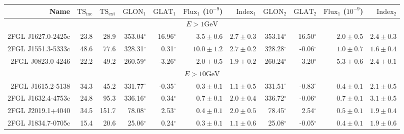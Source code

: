 \documentclass[12pt,preprint]{aastex}
\newcommand{\gev}{\text{GeV}\xspace}
\newcommand{\tsext}{{\ensuremath{\text{TS}_\text{ext}}}\xspace}
\newcommand{\tsinc}{\ensuremath{\text{TS}_\text{inc}}\xspace}
\newcommand{\glon}{\text{GLON}\xspace}
\newcommand{\glat}{\text{GLAT}\xspace}
\renewcommand{\deg}{\ensuremath{^\circ}\xspace}
\begin{document}
\clearpage
\begin{table}
    \begin{centering}
      \begin{tabular}{r|rr|rrrr|rrrr}
        \hline
        \hline
        Name                 &     \tsinc &     \tsext &      $\glon_1$ &      $\glat_1$ & $\text{Flux}_1$ ($10^{-9}$) &   $\text{Index}_1$ &      $\glon_2$ &      $\glat_2$ & $\text{Flux}_1$ ($10^{-9}$) &  $\text{Index}_2$ \\
        \hline
        \multicolumn{11}{c}{$E > 1\gev$} \\
        \hline
        2FGL J1627.0-2425c   &       23.8 &       28.9 &     353.04\deg &      16.96\deg & $       3.5 \pm        0.6$ & $  2.7 \pm   0.3$  &     353.14\deg &      16.50\deg & $       2.0 \pm        0.5$ & $  2.4 \pm   0.3$ \\
        2FGL J1551.3-5333c   &       48.6 &       77.6 &     328.31\deg &       0.31\deg & $      10.0 \pm        1.2$ & $  2.7 \pm   0.2$  &     328.28\deg &      -0.06\deg & $       1.0 \pm        0.7$ & $  1.6 \pm   0.4$ \\
        2FGL J0823.0-4246    &       22.2 &       49.2 &     260.59\deg &      -3.26\deg & $       2.0 \pm        0.5$ & $  1.9 \pm   0.2$  &     260.24\deg &      -3.20\deg & $       5.3 \pm        0.6$ & $  2.4 \pm   0.1$ \\
        \hline
        \multicolumn{11}{c}{$E > 10\gev$} \\
        \hline
        2FGL J1615.2-5138    &       34.3 &       45.2 &     331.77\deg &      -0.35\deg & $       0.3 \pm        0.1$ & $  1.1 \pm   0.5$  &     331.51\deg &      -0.83\deg & $       0.4 \pm        0.1$ & $  2.1 \pm   0.5$ \\
        2FGL J1632.4-4753c   &       24.8 &       95.3 &     336.16\deg &       0.34\deg & $       0.7 \pm        0.1$ & $  2.0 \pm   0.4$  &     336.72\deg &      -0.06\deg & $       0.7 \pm        0.1$ & $  3.1 \pm   0.5$ \\
        2FGL J2019.1+4040    &       34.5 &      151.7 &      78.08\deg &       2.53\deg & $       0.4 \pm        0.1$ & $  2.0 \pm   0.5$  &      78.45\deg &       2.54\deg & $       0.5 \pm        0.1$ & $  1.9 \pm   0.4$ \\
        2FGL J1834.7-0705c   &       15.4 &       20.6 &      25.06\deg &       0.24\deg & $       0.3 \pm        0.1$ & $  1.1 \pm   0.6$  &      25.08\deg &      -0.05\deg & $       0.4 \pm        0.1$ & $  1.9 \pm   0.6$ \\

\end{tabular}
\end{centering}
\end{table}
\end{document}
